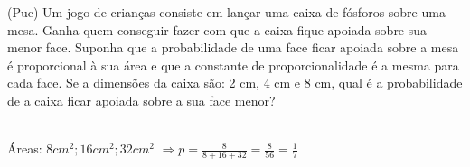 \begin{ex}
(Puc) Um jogo de crianças consiste em lançar uma caixa de fósforos sobre uma mesa. Ganha quem conseguir fazer com que a caixa fique apoiada sobre sua menor face. Suponha que a probabilidade de uma face ficar apoiada sobre a mesa é proporcional à sua área e que a constante de proporcionalidade é a mesma para cada face. Se a dimensões da caixa são: 2 cm, 4 cm e 8 cm, qual é a probabilidade de a caixa ficar apoiada sobre a sua face menor?
  \begin{sol}
    \phantom{A} \\
    Áreas: $8cm^2; 16cm^2; 32 cm^2$
    $\Longrightarrow p=\frac{8}{8+16+32}=\frac{8}{56}=\frac{1}{7}$
  \end{sol}
\end{ex}